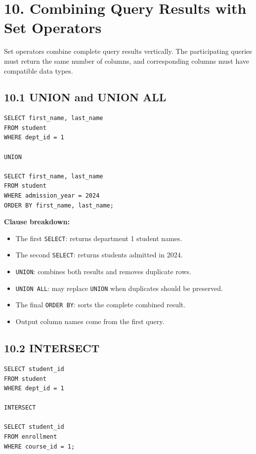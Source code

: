 \documentclass[12pt,a4paper]{article}
\begin{document}
\section*{10. Combining Query Results with Set Operators}
Set operators combine complete query results vertically. The participating queries must return the
same number of columns, and corresponding columns must have compatible data types.

\subsection*{10.1 UNION and UNION ALL}
\begin{verbatim}
SELECT first_name, last_name
FROM student
WHERE dept_id = 1

UNION

SELECT first_name, last_name
FROM student
WHERE admission_year = 2024
ORDER BY first_name, last_name;
\end{verbatim}

\noindent\textbf{Clause breakdown:}
\begin{itemize}
    \item The first \texttt{SELECT}: returns department 1 student names.
    \item The second \texttt{SELECT}: returns students admitted in 2024.
    \item \texttt{UNION}: combines both results and removes duplicate rows.
    \item \texttt{UNION ALL}: may replace \texttt{UNION} when duplicates should be preserved.
    \item The final \texttt{ORDER BY}: sorts the complete combined result.
    \item Output column names come from the first query.
\end{itemize}

\subsection*{10.2 INTERSECT}
\begin{verbatim}
SELECT student_id
FROM student
WHERE dept_id = 1

INTERSECT

SELECT student_id
FROM enrollment
WHERE course_id = 1;
\end{verbatim}
\end{document}
